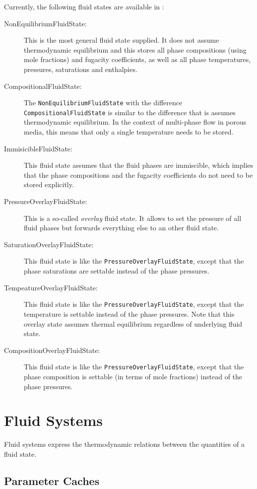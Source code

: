 Currently, the following fluid states are available in \Dumux:
\begin{description}
\item[NonEquilibriumFluidState:] This is the most general
  fluid state supplied. It does not assume thermodynamic equilibrium
  and this stores all phase compositions (using mole fractions) and
  fugacity coefficients, as well as all phase temperatures, pressures,
  saturations and enthalpies.
\item[CompositionalFluidState:] The
  \texttt{NonEquilibriumFluidState} with the difference
  \texttt{CompositionalFluidState} is similar to the difference that
  is assumes thermodynamic equilibrium. In the context of multi-phase
  flow in porous media, this means that only a single temperature
  needs to be stored.
\item[ImmisicibleFluidState:] This fluid state assumes that
  the fluid phases are immiscible, which implies that the phase
  compositions and the fugacity coefficients do not need to be stored
  explicitly.
\item[PressureOverlayFluidState:] This is a so-called {\em
    overlay} fluid state. It allows to set the pressure of all fluid
  phases but forwards everything else to an other fluid state.
\item[SaturationOverlayFluidState:] This fluid state is like
  the \texttt{PressureOverlayFluidState}, except that the phase
  saturations are settable instead of the phase pressures.
\item[TempeatureOverlayFluidState:] This fluid state is like
  the \texttt{PressureOverlayFluidState}, except that the temperature
  is settable instead of the phase pressures. Note that this overlay
  state assumes thermal equilibrium regardless of underlying fluid
  state.
\item[CompositionOverlayFluidState:] This fluid state is like
  the \texttt{PressureOverlayFluidState}, except that the phase
  composition is settable (in terms of mole fractions) instead of the
  phase pressures.
\end{description}

\section{Fluid Systems}

Fluid systems express the thermodynamic relations between the
quantities of a fluid state.

\subsection{Parameter Caches}

